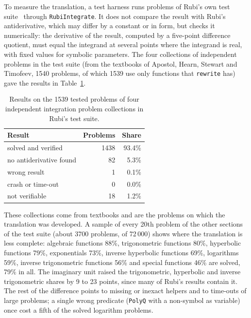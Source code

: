 \documentclass[11pt,a4paper]{article}
\newcommand{\nproblems}{1540}
\newcommand{\ntested}{1539}
\newcommand{\nsolved}{1438}
\newcommand{\psolved}{93.4\%}
\newcommand{\nwrong}{1}
\newcommand{\nfailed}{0}
\begin{document}
To measure the translation, a test harness runs problems of Rubi's own test
suite~\cite{rubitests} through \texttt{RubiIntegrate}. It does not compare
the result with Rubi's antiderivative, which may differ by a constant or in
form, but checks it numerically: the derivative of the result, computed by
a five-point difference quotient, must equal the integrand at several
points where the integrand is real, with fixed values for symbolic
parameters. The four collections of independent problems in the test
suite (from the textbooks of Apostol, Hearn, Stewart and Timofeev,
\nproblems{} problems, of which \ntested{} use only functions that
\texttt{rewrite} has) gave the results in Table~\ref{tab:results}.

\begin{table}[ht]
\centering
\small
\begin{tabular}{@{}lrr@{}}
\toprule
Result & Problems & Share \\
\midrule
solved and verified       & \nsolved & \psolved \\
no antiderivative found   & 82 & 5.3\% \\
wrong result              & \nwrong  & 0.1\% \\
crash or time-out         & \nfailed & 0.0\% \\
not verifiable            & 18 & 1.2\% \\
\bottomrule
\end{tabular}
\caption{Results on the \ntested{} tested problems of four independent
integration problem collections in Rubi's test suite.}
\label{tab:results}
\end{table}

These collections come from textbooks and are the problems on which the
translation was developed. A sample of every 20th problem of the other
sections of the test suite (about 3700 problems, of 72\,000) shows where
the translation is less complete: algebraic functions 88\%, trigonometric
functions 80\%, hyperbolic functions 79\%, exponentials 73\%, inverse
hyperbolic functions 69\%, logarithms 59\%, inverse trigonometric
functions 56\% and special functions 46\% are solved, 79\% in all. The
imaginary unit raised the trigonometric, hyperbolic and inverse
trigonometric shares by 9 to 23 points, since many of Rubi's results
contain it. The rest of the difference points to missing or inexact
helpers and to time-outs of large problems; a single wrong predicate
(\texttt{PolyQ} with a non-symbol as variable) once cost a fifth of the
solved logarithm problems.
\end{document}
